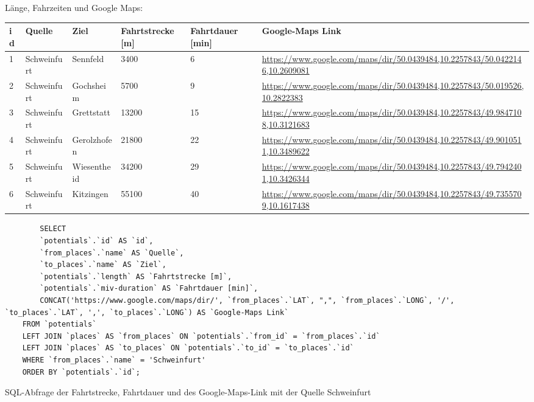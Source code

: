 Länge, Fahrzeiten und Google Maps:
\newline
\begin{tabular}{| l | l | l | l | l | l |}
    \hline
    id & Quelle & Ziel & Fahrtstrecke [m] & Fahrtdauer [min] & Google-Maps Link\\ 
    \hline
    1 & Schweinfurt & Sennfeld & 3400 & 6 & \href{https://www.google.com/maps/dir/50.0439484,10.2257843/50.0422146,10.2609081}{https://www.google.com/maps/dir/50.0439484,10.2257843/50.0422146,10.2609081}\\ 
    \hline
    2 & Schweinfurt & Gochsheim & 5700 & 9 & \href{https://www.google.com/maps/dir/50.0439484,10.2257843/50.019526,10.2822383}{https://www.google.com/maps/dir/50.0439484,10.2257843/50.019526,10.2822383}\\ 
    \hline
    3 & Schweinfurt & Grettstatt & 13200 & 15 & \href{https://www.google.com/maps/dir/50.0439484,10.2257843/49.9847108,10.3121683}{https://www.google.com/maps/dir/50.0439484,10.2257843/49.9847108,10.3121683}\\ 
    \hline
    4 & Schweinfurt & Gerolzhofen & 21800 & 22 & \href{https://www.google.com/maps/dir/50.0439484,10.2257843/49.9010511,10.3489622}{https://www.google.com/maps/dir/50.0439484,10.2257843/49.9010511,10.3489622}\\ 
    \hline
    5 & Schweinfurt & Wiesentheid & 34200 & 29 & \href{https://www.google.com/maps/dir/50.0439484,10.2257843/49.7942401,10.3426344}{https://www.google.com/maps/dir/50.0439484,10.2257843/49.7942401,10.3426344}\\ 
    \hline
    6 & Schweinfurt & Kitzingen & 55100 & 40 & \href{https://www.google.com/maps/dir/50.0439484,10.2257843/49.7355709,10.1617438}{https://www.google.com/maps/dir/50.0439484,10.2257843/49.7355709,10.1617438}\\ 
    \hline
\end{tabular}    
\newline
\newline
\begin{listing}[htbp]
    \begin{verbatim}
        SELECT 
        `potentials`.`id` AS `id`, 
        `from_places`.`name` AS `Quelle`,
        `to_places`.`name` AS `Ziel`, 
        `potentials`.`length` AS `Fahrtstrecke [m]`, 
        `potentials`.`miv-duration` AS `Fahrtdauer [min]`,
        CONCAT('https://www.google.com/maps/dir/', `from_places`.`LAT`, ",", `from_places`.`LONG`, '/', `to_places`.`LAT`, ',', `to_places`.`LONG`) AS `Google-Maps Link`
    FROM `potentials`
    LEFT JOIN `places` AS `from_places` ON `potentials`.`from_id` = `from_places`.`id`
    LEFT JOIN `places` AS `to_places` ON `potentials`.`to_id` = `to_places`.`id`
    WHERE `from_places`.`name` = 'Schweinfurt'
    ORDER BY `potentials`.`id`;
    \end{verbatim}
    \caption{SQL-Abfrage der Fahrtstrecke, Fahrtdauer und des Google-Maps-Link mit der Quelle Schweinfurt}\label{lst-f-schweinfurt}
\end{listing}